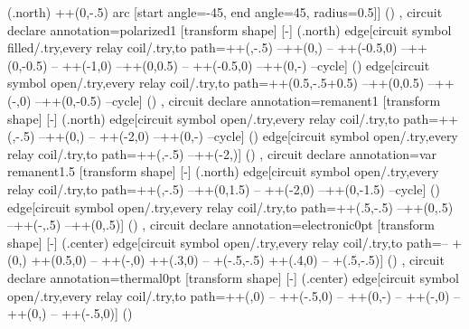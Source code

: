 {{{    (\tikzlastnode.north) ++(0,\tikzcircuitssizeunit-.5\pgflinewidth) arc [start angle=-45, end angle=45, radius=0.5\tikzcircuitssizeunit]}] () 
  },
  circuit declare annotation={polarized}{1\tikzcircuitssizeunit}
  {
    [transform shape]
    [-]
    (\tikzlastnode.north) edge[circuit symbol filled/.try,every relay coil/.try,to path={++(\tikzcircuitssizeunit,-.5\pgflinewidth) --++(0,\tikzcircuitssizeunit) -- ++(-0.5\tikzcircuitssizeunit,0) --++(0,-0.5\tikzcircuitssizeunit) -- ++(-1\tikzcircuitssizeunit,0) --++(0,0.5\tikzcircuitssizeunit) -- ++(-0.5\tikzcircuitssizeunit,0)  --++(0,-\tikzcircuitssizeunit) --cycle}] () edge[circuit symbol open/.try,every relay coil/.try,to path={++(0.5\tikzcircuitssizeunit,-.5\pgflinewidth+0.5\tikzcircuitssizeunit) --++(0,0.5\tikzcircuitssizeunit) --++(-\tikzcircuitssizeunit,0) --++(0,-0.5\tikzcircuitssizeunit) --cycle}] ()
  },
  circuit declare annotation={remanent}{1\tikzcircuitssizeunit}
  {
    [transform shape]
    [-]
    (\tikzlastnode.north) edge[circuit symbol open/.try,every relay coil/.try,to path={++(\tikzcircuitssizeunit,-.5\pgflinewidth) --++(0,\tikzcircuitssizeunit) -- ++(-2\tikzcircuitssizeunit,0) --++(0,-\tikzcircuitssizeunit) --cycle}] () edge[circuit symbol open/.try,every relay coil/.try,to path={++(\tikzcircuitssizeunit,-.5\pgflinewidth) --++(-2\tikzcircuitssizeunit,\tikzcircuitssizeunit)}] ()
  },
  circuit declare annotation={var remanent}{1.5\tikzcircuitssizeunit}
  {
    [transform shape]
    [-]
    (\tikzlastnode.north) edge[circuit symbol open/.try,every relay coil/.try,to path={++(\tikzcircuitssizeunit,-.5\pgflinewidth) --++(0,1.5\tikzcircuitssizeunit) -- ++(-2\tikzcircuitssizeunit,0) --++(0,-1.5\tikzcircuitssizeunit) --cycle}] () edge[circuit symbol open/.try,every relay coil/.try,to path={++(.5\tikzcircuitssizeunit,-.5\pgflinewidth) --++(0,.5\tikzcircuitssizeunit) --++(-\tikzcircuitssizeunit,.5\tikzcircuitssizeunit) --++(0,.5\tikzcircuitssizeunit)}] ()
  },
  circuit declare annotation={electronic}{0pt}
  {
    [transform shape]
    [-]
    (\tikzlastnode.center) edge[circuit symbol open/.try,every relay coil/.try,to path={-- +(0,\tikzcircuitssizeunit) ++(0.5\tikzcircuitssizeunit,0) -- ++(-\tikzcircuitssizeunit,0) ++(.3\tikzcircuitssizeunit,0) -- +(-.5\tikzcircuitssizeunit,-.5\tikzcircuitssizeunit) ++(.4\tikzcircuitssizeunit,0) -- +(.5\tikzcircuitssizeunit,-.5\tikzcircuitssizeunit)}] ()
  },
  circuit declare annotation={thermal}{0pt}
  {
    [transform shape]
    [-]
    (\tikzlastnode.center) edge[circuit symbol open/.try,every relay coil/.try,to path={++(\tikzcircuitssizeunit,0) -- ++(-.5\tikzcircuitssizeunit,0) -- ++(0,-\tikzcircuitssizeunit) -- ++(-\tikzcircuitssizeunit,0) -- ++(0,\tikzcircuitssizeunit) -- ++(-.5\tikzcircuitssizeunit,0)}] ()
}}
